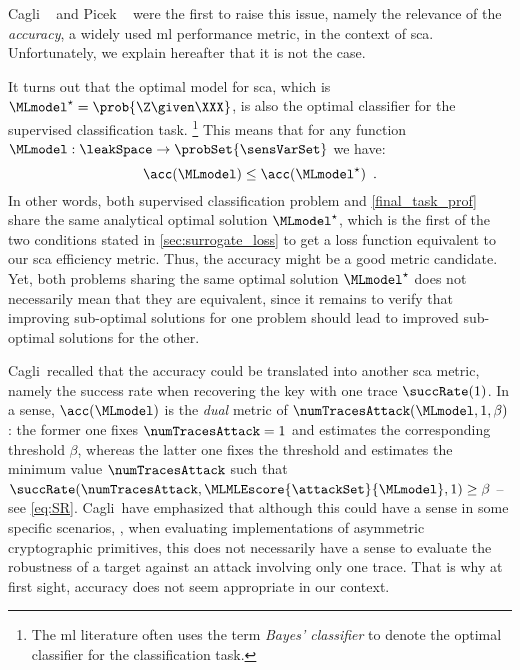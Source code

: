 Cagli \etal{}~\cite{cagli_convolutional_2017} and Picek \etal{}~\cite{picek_curse_2019} were the first to raise this issue, namely the relevance of the \emph{accuracy}, a widely used \gls{ml} performance metric, in the context of \gls{sca}.
Unfortunately, we explain hereafter that it is not the case.

It turns out that the optimal model for \gls{sca}, which is \(\MLmodel^{\star} = \prob{\Z \given \XXX}\), is also the optimal classifier for the supervised classification task.%
\footnote{
	The \gls{ml} literature often uses the term \emph{Bayes' classifier} to denote the optimal classifier for the classification task.
} 
This means that for any function \(\MLmodel: \leakSpace \rightarrow \probSet{\sensVarSet}\) we have:
\begin{equation}
	\acc(\MLmodel) \leq \acc(\MLmodel^{\star}) \enspace .
\end{equation}
In other words, both supervised classification problem and \autoref{final_task_prof} share the same analytical optimal solution \(\MLmodel^\star\), which is the first of the two conditions stated in \autoref{sec:surrogate_loss} to get a loss function equivalent to our \gls{sca} efficiency metric.
Thus, the accuracy might be a good metric candidate.
Yet, both problems sharing the same optimal solution \(\MLmodel^\star\) does not necessarily mean that they are equivalent, since it remains to verify that improving sub-optimal solutions for one problem should lead to improved sub-optimal solutions for the other.

Cagli \etal{}\,recalled that the accuracy could be translated into another \gls{sca} metric, namely the success rate when recovering the key with one trace \(\succRate(1)\).
In a sense, \(\acc(\MLmodel)\) is the \emph{dual} metric of \(\numTracesAttack(\MLmodel, 1, \beta)\): the former one fixes \(\numTracesAttack=1\) and estimates the corresponding threshold \(\beta\), whereas the latter one fixes the threshold and estimates the minimum value \(\numTracesAttack\) such that \(\succRate(\numTracesAttack, \MLMLEscore{\attackSet}{\MLmodel}, 1) \geq \beta\) -- see \autoref{eq:SR}.
Cagli \etal{}\,have emphasized that although this could have a sense in some specific scenarios, \eg{}, when evaluating implementations of asymmetric cryptographic primitives, this does not necessarily have a sense to evaluate the robustness of a target against an attack involving only one trace.
That is why at first sight, accuracy does not seem appropriate in our context.

